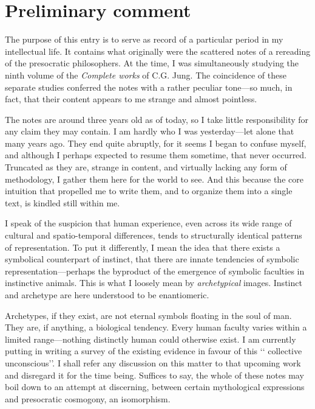 \documentclass[a4paper]{article}
\begin{document}
\section{Preliminary comment}

The purpose of this entry is to serve as record of a particular period in my
intellectual life. It contains what originally were the scattered notes of a
rereading of the presocratic philosophers. At the time, I was simultaneously
studying the ninth volume of the \textit{Complete works} of C.G. Jung. The
coincidence of these separate studies conferred the notes with a rather peculiar
tone---so much, in fact, that their content appears to me strange and almost
pointless.

The notes are around three years old as of today, so I take little
responsibility for any claim they may contain. I am hardly who I was
yesterday---let alone that many years ago. They end quite abruptly, for it seems
I began to confuse myself, and although I perhaps expected to resume them
sometime, that never occurred. Truncated as they are, strange in content, and
virtually lacking any form of methodology, I gather them here for the world to
see. And this because the core intuition that propelled me to write them, and to organize
them into a single text, is kindled still within me. 

I speak of the suspicion that human experience, even across its wide range of
cultural and spatio-temporal differences, tends to structurally identical
patterns of representation. To put it differently, I mean the idea that there
exists a symbolical counterpart of instinct, that there are innate tendencies of
symbolic representation---perhaps the byproduct of the emergence of symbolic
faculties in instinctive animals. This is what I loosely mean by
\textit{archetypical} images. Instinct and archetype are here understood to be
enantiomeric.

Archetypes, if they exist, are not eternal symbols floating in the soul of man.
They are, if anything, a biological tendency. Every human faculty varies within
a limited range---nothing distinctly human could otherwise exist. I am currently
putting in writing a survey of the existing evidence in favour of this \lq\lq
collective unconscious\rq\rq{}. I shall refer any discussion on this matter to
that upcoming work and disregard it for the time being. Suffices to say, the
whole of these notes may boil down to an attempt at discerning,
between certain mythological expressions and presocratic cosmogony, an
isomorphism.
\end{document}
